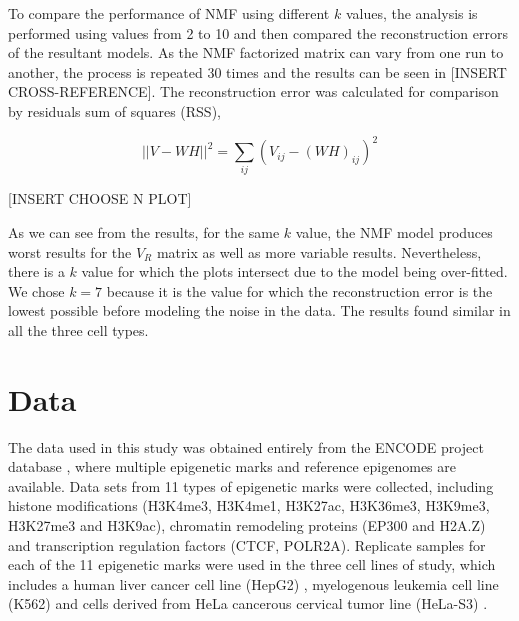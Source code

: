 \medskip

To compare the performance of NMF using different \(k\) values, the analysis is performed using values from 2 to 10 and then compared the reconstruction errors of the resultant models. As the NMF factorized matrix can vary from one run to another, the process is repeated 30 times and the results can be seen in [INSERT CROSS-REFERENCE]. The reconstruction error was calculated for comparison by residuals sum of squares (RSS),

\begin{equation}
    \vert \vert V - WH \vert \vert ^ 2 = \sum_{ij} (V_{ij} - (WH)_{ij} )^2
\end{equation}

[INSERT CHOOSE N PLOT]

\medskip

As we can see from the results, for the same \(k\) value, the NMF model produces worst results for the \(V_R\) matrix as well as more variable results. Nevertheless, there is a \(k\) value for which the plots intersect due to the model being over-fitted. We chose \(k = 7\) because it is the value for which the reconstruction error is the lowest possible before modeling the noise in the data. The results found similar in all the three cell types.


\section{Data}\label{data}

The data used in this study was obtained entirely from the ENCODE project database \cite{Feingold2004}, where multiple epigenetic marks and reference epigenomes are available. Data sets from 11 types of epigenetic marks were collected, including histone modifications (H3K4me3, H3K4me1, H3K27ac, H3K36me3, H3K9me3, H3K27me3 and H3K9ac), chromatin remodeling proteins (EP300 and H2A.Z) and transcription regulation factors (CTCF, POLR2A). Replicate samples for each of the 11 epigenetic marks were used in the three cell lines of study, which includes a human liver cancer cell line (HepG2) \cite{Aden1979}, myelogenous leukemia cell line (K562) \cite{Andersson1979} and cells derived from HeLa cancerous cervical tumor line (HeLa-S3) \cite{Douglas1973,Chen2008}.

